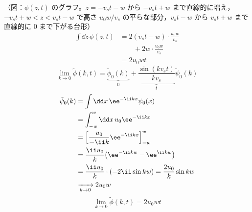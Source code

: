 （図：$\phi(z,t)$ のグラフ。$z=-v_st-w$ から $-v_st+w$ まで直線的に増え，$-v_st+w<z<v_st-w$ で高さ $u_0w/v_s$ の平らな部分，$v_st-w$ から $v_st+w$ まで直線的に $0$ まで下がる台形）
\begin{align*}
  \int\dd z\,\phi(z,t)&=2(v_st-w)\cdot\frac{u_0w}{v_s}\\
  &\qquad+2w\cdot\frac{u_0w}{v_s}\\
  &=2u_0wt
\end{align*}
\[ \lim_{k\to0}\tilde{\phi}(k,t)=\underbrace{\tilde{\phi}_0(k)}_{0}+\underbrace{\frac{\sin(kv_st)}{kv_s}}_{t}\tilde{\psi}_0(k) \]
\begin{align*}
  \tilde{\psi}_0(k)&=\int\dd x\,\ee^{-\ii kx}\psi_0(x)\\
  &=\int_{-w}^{w}\dd x\,u_0\ee^{-\ii kx}\\
  &=\Bigl[\frac{u_0}{-\ii k}\ee^{-\ii kx}\Bigr]_{-w}^{w}\\
  &=\frac{\ii u_0}{k}\bigl(\ee^{-\ii kw}-\ee^{\ii kw}\bigr)\\
  &=\frac{\ii u_0}{k}\cdot(-2\ii\sin kw)=\frac{2u_0}{k}\sin kw\\
  &\xrightarrow[k\to0]{}2u_0w
\end{align*}
\[ \lim_{k\to0}\tilde{\phi}(k,t)=2u_0wt \]
